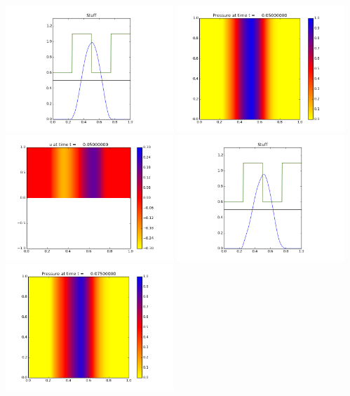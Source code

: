 \documentclass[11pt]{article}
\begin{document}
\vskip 10pt 
\includegraphics[width=0.475\textwidth]{frame0001fig3.png}
\vskip 10pt 
\includegraphics[width=0.475\textwidth]{frame0002fig0.png}
\includegraphics[width=0.475\textwidth]{frame0002fig1.png}
\vskip 10pt 
\includegraphics[width=0.475\textwidth]{frame0002fig3.png}
\vskip 10pt 
\includegraphics[width=0.475\textwidth]{frame0003fig0.png}
\end{document}
